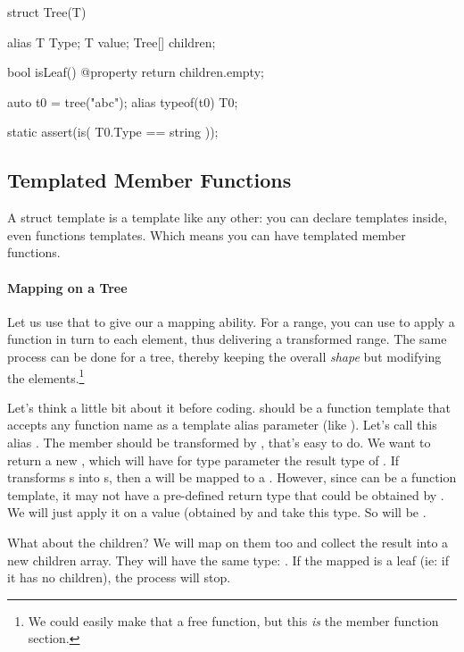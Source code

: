 \begin{dcode}
struct Tree(T)
{
    alias T Type;
    T value;
    Tree[] children;

    bool isLeaf() @property { return children.empty;}
}     

auto t0 = tree("abc");
alias typeof(t0) T0;

static assert(is( T0.Type == string ));
\end{dcode}

\subsection{Templated Member Functions}\label{membertemplates}

A struct template is a template like any other: you can declare templates inside, even functions templates. Which means you can have templated member functions. 

\paragraph{Mapping on a Tree} Let us use that to give our  a mapping ability. For a range, you can use  to apply a function in turn to each element, thus delivering a transformed range. The same process can be done for a tree, thereby keeping the overall \emph{shape} but modifying the elements.\footnote{ We could easily make that a free function, but this \emph{is} the member function section.}

Let's think a little bit about it before coding.  should be a function template that accepts any function name as a template alias parameter (like ). Let's call this alias . The  member should be transformed by , that's easy to do. We want to return a new , which will have for type parameter the result type of . If  transforms s into s, then a  will be mapped to a . However, since  can be a function template, it may not have a pre-defined return type that could be obtained by . We will just apply it on a  value (obtained by  and take this type. So  will be .

What about the children? We will map  on them too and collect the result into a new children array. They will have the same type: . If the mapped  is a leaf (ie: if it has no children), the process will stop.

